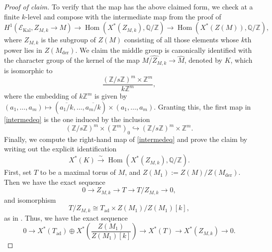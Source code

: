 \documentclass[11pt]{amsart}
\theoremstyle{definition}
\newcommand{\mc}{\mathcal}
\newcommand{\Z}{\mathbb{Z}}
\newcommand{\Q}{\mathbb{Q}}
\newcommand{\ov}{\overline}
\DeclareMathOperator{\Kal}{Kal}
\DeclareMathOperator{\Hom}{Hom}
\DeclareMathOperator{\ad}{ad}
\begin{document}
\begin{proof}[Proof of claim]
To verify that the map has the above claimed form, we check at a finite $k$-level and compose with the intermediate map from the proof of \cite[Proposition 4.21]{DS24}
\begin{equation}\label{intermedeq}
    H^1(\mc{E}_{\Kal}, Z_{M,k} \to M) \to \Hom(X^{*}(Z_{M,k}), \Q/\Z) \to \Hom(X^{*}(Z(M)), \Q/\Z),
\end{equation}
where $Z_{M,k}$ is the subgroup of $Z(M)$ consisting of all those elements whose $k$th power lies in $Z(M_{\text{der}})$. We claim the middle group is canonically identified with the character group of the kernel of the map $\widehat{M/Z_{M,k}} \to \widehat{M}$, denoted by $K$, which is isomorphic to
\begin{equation*}
    \frac{(\Z/s\Z)^{m} \times \Z^{m}}{k\Z^{m}},
\end{equation*}
where the embedding of $k\Z^{m}$ is given by $(a_{1}, \dots, a_{m}) \mapsto (\ov{a_{1}/k}, \dots, \ov{a_{m}/k}) \times (a_{1}, \dots, a_{m})$. Granting this, the first map in \eqref{intermedeq} is the one induced by the inclusion
\begin{equation*}
    (\Z/s\Z)^{m} \times (\Z^{m})_{0} \hookrightarrow (\Z/s\Z)^{m} \times \Z^{m}.
\end{equation*}
Finally, we compute the right-hand map of \eqref{intermedeq} and prove the claim by writing out the explicit identification
\begin{equation*}
    X^{*}(K) \xrightarrow{\sim} \Hom(X^{*}(Z_{M,k}), \Q/\Z).
\end{equation*}
First, set $T$ to be a maximal torus of $M$, and $Z(M_{1}) := Z(M)/Z(M_{\text{der}})$. Then we have the exact sequence
\begin{equation*}
    0 \rightarrow Z_{M,k} \rightarrow T \rightarrow T/Z_{M,k} \rightarrow 0,
\end{equation*}
and isomorphism
\begin{equation*}
    T/Z_{M,k} \cong T_{\ad} \times Z(M_1)/Z(M_1)[k],
\end{equation*}
as in \cite[p. 71]{Kaletha18}. Thus, we have the exact sequence
\begin{equation}\label{annoyingSESbis}
   0 \to X^{*}(T_{\ad}) \oplus X^{*}(\frac{Z(M_{1})}{Z(M_{1})[k]}) \to X^{*}(T) \to  X^{*}(Z_{M,k})  \to 0.
\end{equation}


\end{proof}
\end{document}
